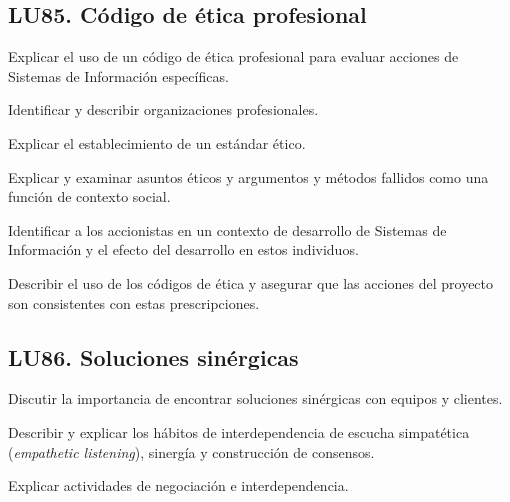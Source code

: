 \subsection{LU85. Código de ética profesional}\label{sec:LU85}
\begin{LearningUnit}
\begin{LUGoal}
\item Explicar el uso de un código de ética profesional para evaluar acciones de Sistemas de Información específicas.
\end{LUGoal}

\begin{LUObjective}
\item Identificar y describir organizaciones profesionales.
\item Explicar el establecimiento de un estándar ético.
\item Explicar y examinar asuntos éticos y argumentos y métodos fallidos como una función de contexto social.
\item Identificar a los accionistas en un contexto de desarrollo de Sistemas de Información y el efecto del desarrollo en estos individuos.
\item Describir el uso de los códigos de ética y asegurar que las acciones del proyecto son consistentes con estas prescripciones.
\end{LUObjective}
\end{LearningUnit}

\subsection{LU86. Soluciones sinérgicas}\label{sec:LU86}
\begin{LearningUnit}
\begin{LUGoal}
\item Discutir la importancia de encontrar soluciones sinérgicas con equipos y clientes.
\end{LUGoal}

\begin{LUObjective}
\item Describir y explicar los hábitos de interdependencia de escucha simpatética ({\it empathetic listening}), sinergía y construcción de consensos.
\item Explicar actividades de negociación e interdependencia.
\end{LUObjective}
\end{LearningUnit}


